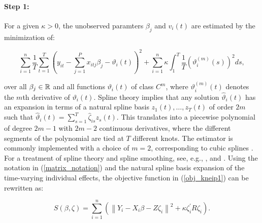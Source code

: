 \paragraph{Step 1:} For a given $\kappa >0 $, the unobserved paramters $\beta_j$ and $v_i(t)$ are estimated by the minimization of:


\begin{equation}\label{obj_kneip1}
    \sum_{i=1}^n \frac{1}{T} \sum_{t=1}^T\left(y_{i t}-\sum_{j=1}^P x_{i t j} \beta_j-\vartheta_i(t)\right)^2+\sum_{i=1}^n \kappa \int_1^T \frac{1}{T}\left(\vartheta_i^{(m)}(s)\right)^2 d s ,
\end{equation}

over all $\beta_j \in \mathbb{R}$ and all functions $\vartheta_i(t)$ of class $C^m$, where $\vartheta^{(m)}_i(t)$ denotes the $m$th derivative of $\vartheta_i(t)$. Spline theory implies that any solution $\hat{\vartheta}_i(t)$ has an expansion in terms of a natural spline basis $z_1(t), \ldots, z_T(t)$ of order $2m$ such that $\hat{\vartheta}_i(t) = \sum_{s=1}^T \hat{\zeta}_{is} z_s(t)$. This translates into a piecewise polynomial of degree $2m - 1$ with $2m -2$ continuous derivatives, where the different segments of the polynomial are tied at $T$ different knots. The estimator is commonly implemented with a choice of $m = 2$, corresponding to cubic splines \citep{kneip2012new, bada2012phtt}. For a treatment of spline theory and spline smoothing, see, e.g., \citet{eubank1999nonparametric}, \citet{de2001practical} and \citet{wasserman2006all}. Using the notation in (\ref{matrix_notation}) and the natural spline basis expansion of the time-varying individual effects, the objective function in  (\ref{obj_kneip1}) can be rewritten as:

\begin{equation}\label{matrix_objective}
    S(\beta, \zeta)=\sum_{i=1}^n\left(\left\|Y_i-X_i \beta-Z \zeta_i\right\|^2+\kappa \zeta_i^{\prime} R \zeta_i\right) .
\end{equation}

